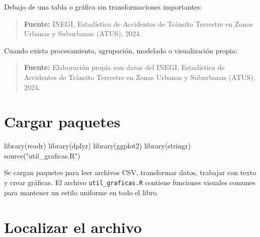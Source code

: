 \documentclass[
  spanish,
  10.5pt,
  letterpaper,
  openany,
  headings=big]{scrbook}
\newenvironment{Shaded}{}{}
\newcommand{\FunctionTok}[1]{\textcolor[rgb]{0.44,0.26,0.76}{#1}}
\newcommand{\NormalTok}[1]{\textcolor[rgb]{0.14,0.16,0.18}{#1}}
\newcommand{\StringTok}[1]{\textcolor[rgb]{0.01,0.18,0.38}{#1}}
\begin{document}
Debajo de una tabla o gráfica sin transformaciones importantes:

\begin{quote}
\textbf{Fuente:} INEGI, Estadística de Accidentes de Tránsito Terrestre
en Zonas Urbanas y Suburbanas (ATUS), 2024.
\end{quote}

Cuando exista procesamiento, agrupación, modelado o visualización
propia:

\begin{quote}
\textbf{Fuente:} Elaboración propia con datos del INEGI, Estadística de
Accidentes de Tránsito Terrestre en Zonas Urbanas y Suburbanas (ATUS),
2024.
\end{quote}

\section{Cargar paquetes}\label{cargar-paquetes}

\begin{Shaded}
\begin{Highlighting}[]
\FunctionTok{library}\NormalTok{(readr)}
\FunctionTok{library}\NormalTok{(dplyr)}
\FunctionTok{library}\NormalTok{(ggplot2)}
\FunctionTok{library}\NormalTok{(stringr)}
\FunctionTok{source}\NormalTok{(}\StringTok{"util\_graficas.R"}\NormalTok{)}
\end{Highlighting}
\end{Shaded}

\begin{tcolorbox}[enhanced jigsaw, arc=.35mm, bottomrule=.15mm, bottomtitle=1mm, breakable, colback=white, colbacktitle=quarto-callout-note-color!10!white, colframe=quarto-callout-note-color-frame, coltitle=black, left=2mm, leftrule=.75mm, opacityback=0, opacitybacktitle=0.6, rightrule=.15mm, title=\textcolor{quarto-callout-note-color}{\faInfo}\hspace{0.5em}{Explicación del código}, titlerule=0mm, toprule=.15mm, toptitle=1mm]

Se cargan paquetes para leer archivos CSV, transformar datos, trabajar
con texto y crear gráficas. El archivo \texttt{util\_graficas.R}
contiene funciones visuales comunes para mantener un estilo uniforme en
todo el libro.

\end{tcolorbox}

\section{Localizar el archivo}\label{localizar-el-archivo}
\end{document}
